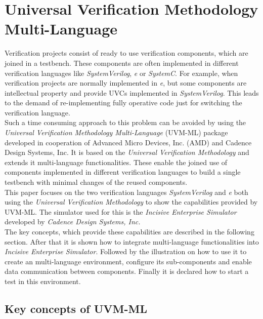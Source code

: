 \section{Universal Verification Methodology Multi-Language}\label{uvm_ml}
Verification projects consist of ready to use verification components, which are joined in a testbench. These components
are often implemented in different verification languages like \emph{SystemVerilog}, \textit{e} or \emph{SystemC}. For
example, when verification projects are normally implemented in \textit{e}, but some components are intellectual
property and provide UVCs implemented in \emph{SystemVerilog}. This leads to the demand of re-implementing fully
operative code just for switching the verification language.\\
Such a time consuming approach to this problem can be avoided by using the \emph{Universal Verification Methodology
Multi-Language} (UVM-ML) package developed in cooperation of Advanced Micro Devices, Inc. (AMD) and Cadence Design
Systems, Inc. It is based on the \emph{Universal Verification Methodology} and extends it multi-language
functionalities. These enable the joined use of components implemented in different verification languages to build a
single testbench with minimal changes of the reused components.\\
This paper focuses on the two verification languages \emph{SystemVerilog} and \textit{e} both using the \emph{Universal
Verification Methodology} to show the capabilities provided by UVM-ML. The simulator used for this is the
\emph{Incisive Enterprise Simulator} developed by \emph{Cadence Design Systems, Inc.}\\
The key concepts, which provide these capabilities are described in the following section. After that it is shown how to
integrate multi-language functionalities into \emph{Incisive Enterprise Simulator}. Followed by the illustration on how
to use it to create an multi-language environment, configure its sub-components and enable data communication between
components. Finally it is declared how to start a test in this environment.

\subsection{Key concepts of UVM-ML}

